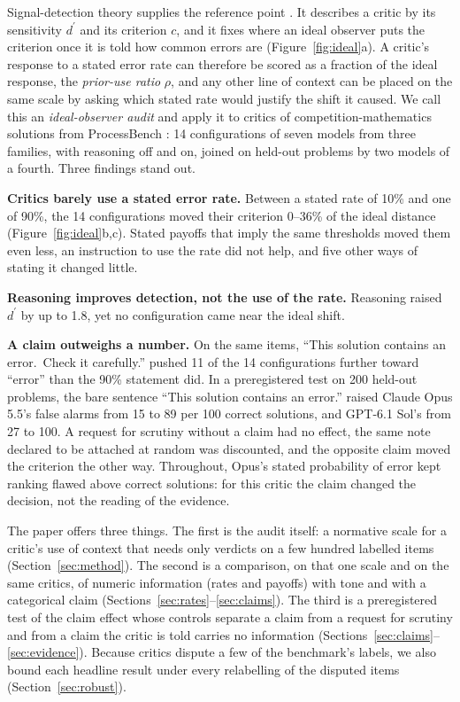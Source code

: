 \documentclass[letterpaper]{article} %
\newcommand{\dprime}{d^{\prime}}
\begin{document}
Signal-detection theory supplies the reference point \citep{green1966signal,macmillan2005detection}. It describes a critic by its sensitivity $\dprime$ and its criterion $c$, and it fixes where an ideal observer puts the criterion once it is told how common errors are (Figure~\ref{fig:ideal}a). A critic's response to a stated error rate can therefore be scored as a fraction of the ideal response, the \emph{prior-use ratio} $\rho$, and any other line of context can be placed on the same scale by asking which stated rate would justify the shift it caused. We call this an \emph{ideal-observer audit} and apply it to critics of competition-mathematics solutions from ProcessBench \citep{zheng2025processbench}: 14 configurations of seven models from three families, with reasoning off and on, joined on held-out problems by two models of a fourth. Three findings stand out.

\textbf{Critics barely use a stated error rate.} Between a stated rate of 10\% and one of 90\%, the 14 configurations moved their criterion 0--36\% of the ideal distance (Figure~\ref{fig:ideal}b,c). Stated payoffs that imply the same thresholds moved them even less, an instruction to use the rate did not help, and five other ways of stating it changed little.

\textbf{Reasoning improves detection, not the use of the rate.} Reasoning raised $\dprime$ by up to 1.8, yet no configuration came near the ideal shift.

\textbf{A claim outweighs a number.} On the same items, ``This solution contains an error.\ Check it carefully.'' pushed 11 of the 14 configurations further toward ``error'' than the 90\% statement did. In a preregistered test on 200 held-out problems, the bare sentence ``This solution contains an error.'' raised Claude Opus 5.5's false alarms from 15 to 89 per 100 correct solutions, and GPT-6.1 Sol's from 27 to 100. A request for scrutiny without a claim had no effect, the same note declared to be attached at random was discounted, and the opposite claim moved the criterion the other way. Throughout, Opus's stated probability of error kept ranking flawed above correct solutions: for this critic the claim changed the decision, not the reading of the evidence.

The paper offers three things. The first is the audit itself: a normative scale for a critic's use of context that needs only verdicts on a few hundred labelled items (Section~\ref{sec:method}). The second is a comparison, on that one scale and on the same critics, of numeric information (rates and payoffs) with tone and with a categorical claim (Sections~\ref{sec:rates}--\ref{sec:claims}). The third is a preregistered test of the claim effect whose controls separate a claim from a request for scrutiny and from a claim the critic is told carries no information (Sections~\ref{sec:claims}--\ref{sec:evidence}). Because critics dispute a few of the benchmark's labels, we also bound each headline result under every relabelling of the disputed items (Section~\ref{sec:robust}).
\end{document}
